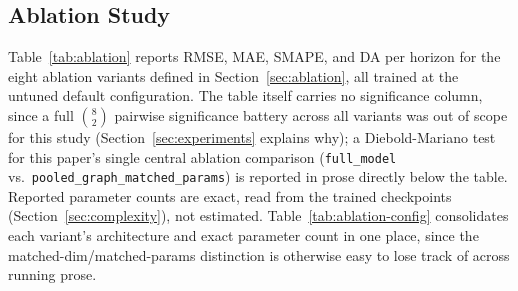 \documentclass[journal]{IEEEtran}
\begin{document}
\subsection{Ablation Study}
\label{sec:ablation-results}

Table~\ref{tab:ablation} reports RMSE, MAE, SMAPE, and DA per horizon for the eight ablation variants defined in Section~\ref{sec:ablation}, all trained at the untuned default configuration. The table itself carries no significance column, since a full $\binom{8}{2}$ pairwise significance battery across all variants was out of scope for this study (Section~\ref{sec:experiments} explains why); a Diebold-Mariano test for this paper's single central ablation comparison (\texttt{full\_model} vs.\ \texttt{pooled\_graph\_matched\_params}) is reported in prose directly below the table. Reported parameter counts are exact, read from the trained checkpoints (Section~\ref{sec:complexity}), not estimated. Table~\ref{tab:ablation-config} consolidates each variant's architecture and exact parameter count in one place, since the matched-dim/matched-params distinction is otherwise easy to lose track of across running prose.

\begin{table}[t]
\centering
\caption{Ablation-variant configurations. Variants (a)--(d) share the untuned default attention-head count (4) and GNN-layer count (2, Section~\ref{sec:impl}); only VMD, graph type, and hidden dimension $d_h$ vary. The two graph-fix variants (e) additionally set \texttt{no\_decay\_graph\_embeddings}, which changes how the graph embeddings are normalized and regularized, not their dimensionality; their parameter counts, read directly from each variant's trained checkpoint state dict, are essentially identical to \texttt{full\_model}'s.}
\label{tab:ablation-config}
\end{table}
\end{document}
